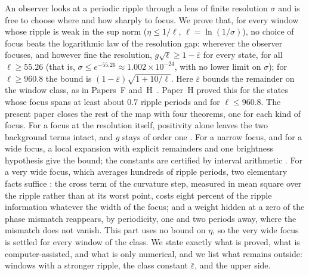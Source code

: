 An observer looks at a periodic ripple through a lens of finite resolution $\sigma$ and is free to choose where and how sharply to focus.
We prove that, for every window whose ripple is weak in the sup norm ($\eta\le1/\ell$, $\ell=\ln(1/\sigma)$), no choice of focus beats the logarithmic law of the resolution gap:
wherever the observer focuses, and however fine the resolution, $g\sqrt{\ell}\ge1-\bar\varepsilon$ for every state, for all $\ell\ge55.26$ (that is, $\sigma\le e^{-55.26}\approx1.002\times10^{-24}$, with no lower limit on $\sigma$); for $\ell\ge960.8$ the bound is $(1-\bar\varepsilon)\sqrt{1+10/\ell}$.
Here $\bar\varepsilon$ bounds the remainder on the window class, as in Papers~F and~H~\cite{F,H}.
Paper~H proved this for the states whose focus spans at least about $0.7$ ripple periods and for $\ell\le960.8$.
The present paper closes the rest of the map with four theorems, one for each kind of focus.
For a focus at the resolution itself, positivity alone leaves the two background terms intact, and $g$ stays of order one \proofst.
For a narrow focus, and for a wide focus, a local expansion with explicit remainders and one brightness hypothesis give the bound; the constants are certified by interval arithmetic .
For a very wide focus, which averages hundreds of ripple periods, two elementary facts suffice \proofst:
the cross term of the curvature step, measured in mean square over the ripple rather than at its worst point, costs eight percent of the ripple information whatever the width of the focus;
and a weight hidden at a zero of the phase mismatch reappears, by periodicity, one and two periods away, where the mismatch does not vanish.
This part uses no bound on $\eta$, so the very wide focus is settled for every window of the class.
We state exactly what is proved, what is computer-assisted, and what is only numerical, and we list what remains outside: windows with a stronger ripple, the class constant $\bar\varepsilon$, and the upper side.

